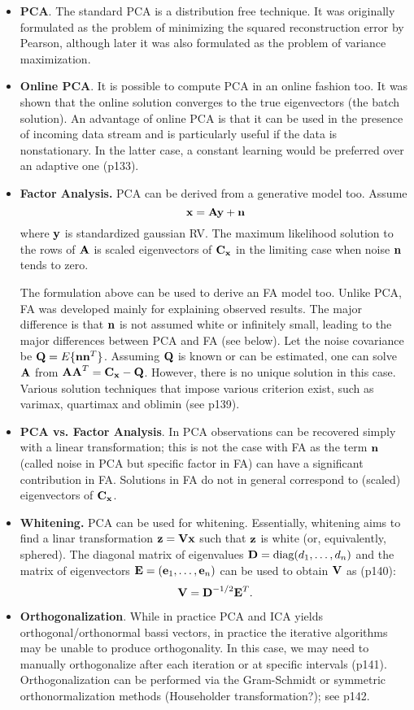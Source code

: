 \documentclass[a4paper]{book}
\begin{document}
\begin{itemize}
\item \textbf{PCA}. The standard PCA is a distribution free technique. It was originally formulated as the problem of minimizing the squared reconstruction error by Pearson, although later it was also formulated as the problem of  variance maximization. 
\item \textbf{Online PCA}. It is possible to compute PCA in an online fashion too. It was shown that the online solution converges to the true eigenvectors (\ie the batch solution). An advantage of online PCA is that it can be used in the presence of incoming data stream and is particularly useful if the data is nonstationary. In the latter case, a constant learning would be preferred over an adaptive one (p133).
\item \textbf{Factor Analysis.} PCA can be derived from a generative model too. Assume $$\mathbf{x = Ay + n}$$ 
where $\mathbf y$ is standardized gaussian RV. The maximum likelihood solution to the rows of $\mathbf A$ is scaled eigenvectors of $\mathbf{C_x}$ in the limiting case when noise $\mathbf n$ tends to zero.

The formulation above can be used to derive an FA model too. Unlike PCA, FA was developed mainly for explaining observed results. The major difference is that $\mathbf n$ is not assumed white or infinitely small, leading to the major differences between PCA and FA (see below). Let the noise covariance be $\mathbf{Q}=E\mathbf\{\mathbf{nn}^T\}$. Assuming $\mathbf{Q}$ is known or can be estimated, one can solve $\mathbf A$ from $\mathbf{AA}^T=\mathbf{C_x-Q}$. However, there is no unique solution in this case. Various solution techniques that impose various criterion exist, such as varimax, quartimax and oblimin (see p139).
\item \textbf{PCA vs. Factor Analysis}. In PCA observations can be recovered simply with a linear transformation; this is not the case with FA as the term $\mathbf n$ (called noise in PCA but specific factor in FA) can have a significant contribution in FA. Solutions in FA do not in general correspond to (scaled) eigenvectors of $\mathbf{C_x}$. 

\item \textbf{Whitening.} PCA  can be used for whitening. Essentially, whitening aims to find a linar transformation $\mathbf{z=Vx}$ such that $\mathbf z$ is white (or, equivalently, sphered). The diagonal matrix of eigenvalues $\mathbf{D}=\text{diag}(d_1,\hdots,d_n)$ and the matrix of eigenvectors $\mathbf{E}=(\mathbf{e}_1,\hdots,\mathbf{e}_n)$ can be used to obtain $\mathbf V$ as (p140): $$\mathbf{V=D}^{-1/2}\mathbf{E}^T.$$

\item \textbf{Orthogonalization}. While in practice PCA and ICA yields orthogonal/orthonormal bassi vectors, in practice the iterative algorithms may be unable to produce orthogonality. In this case, we may need to manually orthogonalize after each iteration or at specific intervals (p141). Orthogonalization can be performed via the Gram-Schmidt or symmetric orthonormalization methods (Householder transformation?); see p142.
\end{itemize}
\end{document}
